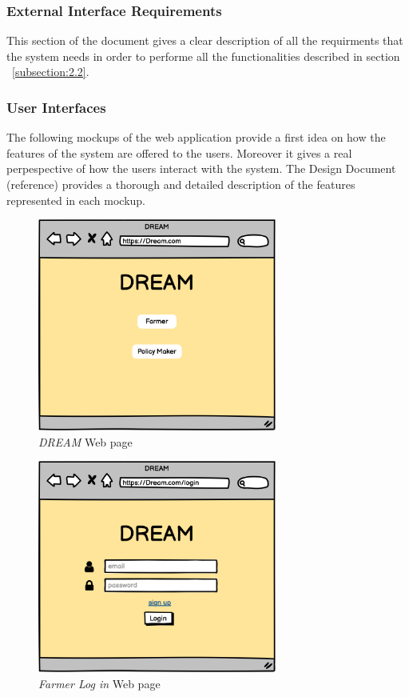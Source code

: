 \subsubsection{External Interface Requirements}
This section of the document gives a clear description of all the requirments that the system needs in order to performe all 
the functionalities described in section ~\ref{subsection:2.2}.

\subsubsection{User Interfaces}
The following mockups of the web application provide a first idea on how the features of the system are offered to the users. 
Moreover it gives a real perpespective of how the users interact with the system. 
The Design Document (reference) provides a thorough and detailed description of the features represented in each mockup.

\begin{figure}[H]
    \begin{center}
    \includegraphics[width=0.7\textwidth]{mocups/Dream.png}
    \caption{\emph{DREAM} Web page}
    \label{fig:sequence1}
    \end{center}
\end{figure}

\begin{figure}[H]
    \begin{center}
    \includegraphics[width=0.7\textwidth]{mocups/FLogIn.png}
    \caption{\emph{Farmer Log in} Web page}
    \label{fig:sequence1}
    \end{center}
\end{figure}

